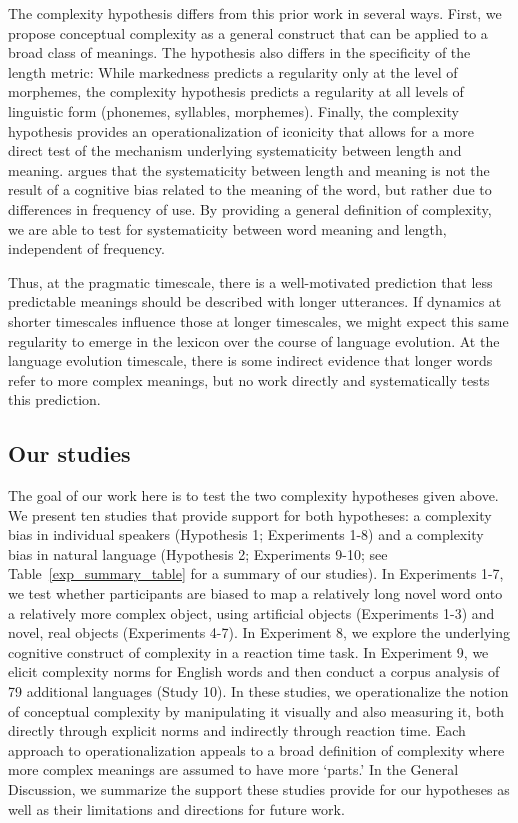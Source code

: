 \documentclass[man]{apa2}
\begin{document}
The complexity hypothesis differs from this prior work in several ways.  First, we propose conceptual complexity as a general construct that can be applied to a broad class of meanings. The hypothesis also differs in the specificity of the length metric: While markedness predicts a regularity only at the level of morphemes, the complexity hypothesis predicts a regularity at all levels of linguistic form (phonemes, syllables, morphemes). Finally, the complexity hypothesis provides an operationalization of iconicity that allows for a more direct test of the mechanism underlying systematicity between length and meaning.   argues that the systematicity between length and meaning is not the result of a cognitive bias related to the meaning of the word, but rather due to differences in frequency of use. By providing a general definition of complexity, we are able to test for systematicity between word meaning and length, independent of frequency. 

Thus, at the pragmatic timescale, there is a well-motivated prediction that less predictable meanings should be described with longer utterances. If dynamics at shorter timescales influence those at longer timescales, we might expect this same regularity to emerge in the lexicon over the course of language evolution. At the language evolution timescale, there is some indirect evidence that longer words refer to more complex meanings, but no work directly and systematically tests this prediction.

\subsection{Our studies}

The goal of our work here is to test the two complexity hypotheses given above. We present ten studies that provide support for both hypotheses: a complexity bias in individual speakers (Hypothesis 1; Experiments 1-8) and a complexity bias in natural language (Hypothesis 2; Experiments 9-10; see Table~\ref{exp_summary_table} for a summary of our studies). In Experiments 1-7, we test whether participants are biased to map a relatively long novel word onto a relatively more complex object, using artificial objects (Experiments 1-3) and novel, real objects (Experiments 4-7). In Experiment 8, we explore the underlying cognitive construct of complexity in a reaction time task. In Experiment 9, we elicit complexity norms for English words and then conduct a corpus analysis of 79 additional languages (Study 10). In these studies, we operationalize the notion of conceptual complexity by manipulating it visually and also measuring it, both directly through explicit norms and indirectly through reaction time. Each approach to operationalization appeals to a broad definition of complexity where more complex meanings are assumed to have more `parts.' In the General Discussion, we  summarize the support these studies provide for our hypotheses as well as their limitations and directions for future work.
\end{document}
